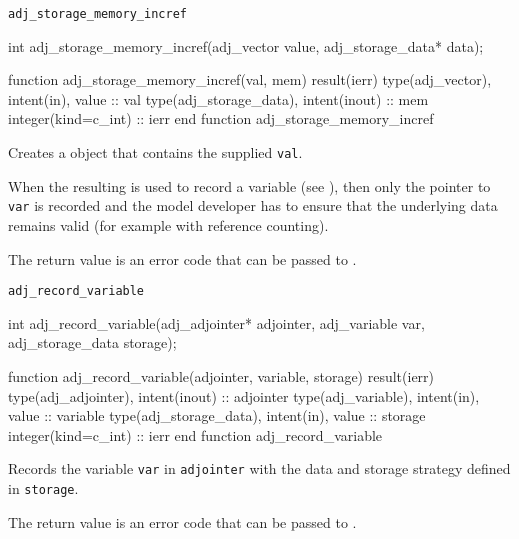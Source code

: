 \begin{boxwithtitle}{\texttt{adj_storage_memory_incref}}
\begin{minipage}{\columnwidth}
\begin{ccode}
  int adj_storage_memory_incref(adj_vector value, adj_storage_data* data);
\end{ccode}
\begin{fortrancode}
  function adj_storage_memory_incref(val, mem) result(ierr)
    type(adj_vector), intent(in), value :: val
    type(adj_storage_data), intent(inout) :: mem
    integer(kind=c_int) :: ierr
  end function adj_storage_memory_incref
\end{fortrancode}
\end{minipage}
\end{boxwithtitle}
Creates a  object that contains the supplied  \texttt{val}.

When the resulting  is used to record a variable (see ), 
then only the pointer to \texttt{var} is recorded and the model developer has to ensure that the underlying data remains valid 
(for example with reference counting).

The return value is an error code that can be passed to .

\begin{boxwithtitle}{\texttt{adj_record_variable}}
\begin{minipage}{\columnwidth}
\begin{ccode}
  int adj_record_variable(adj_adjointer* adjointer, adj_variable var, 
                          adj_storage_data storage);
\end{ccode}
\begin{fortrancode}
  function adj_record_variable(adjointer, variable, storage) result(ierr) 
    type(adj_adjointer), intent(inout) :: adjointer
    type(adj_variable), intent(in), value :: variable
    type(adj_storage_data), intent(in), value :: storage
    integer(kind=c_int) :: ierr
  end function adj_record_variable
\end{fortrancode}
\end{minipage}
\end{boxwithtitle}
Records the variable \texttt{var} in \texttt{adjointer} with the data and storage strategy defined in \texttt{storage}.

The return value is an error code that can be passed to .

